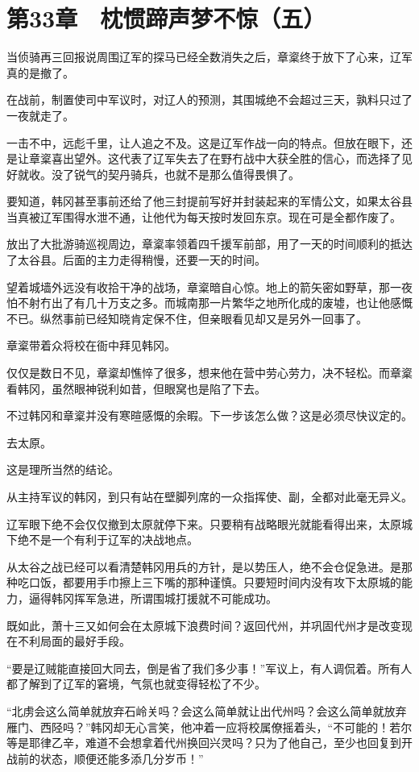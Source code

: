 \section{第33章　枕惯蹄声梦不惊（五）}

当侦骑再三回报说周围辽军的探马已经全数消失之后，章楶终于放下了心来，辽军真的是撤了。

在战前，制置使司中军议时，对辽人的预测，其围城绝不会超过三天，孰料只过了一夜就走了。

一击不中，远彪千里，让人追之不及。这是辽军作战一向的特点。但放在眼下，还是让章楶喜出望外。这代表了辽军失去了在野冇战中大获全胜的信心，而选择了见好就收。没了锐气的契丹骑兵，也就不是那么值得畏惧了。

要知道，韩冈甚至事前还给了他三封提前写好并封装起来的军情公文，如果太谷县当真被辽军围得水泄不通，让他代为每天按时发回东京。现在可是全都作废了。

放出了大批游骑巡视周边，章楶率领着四千援军前部，用了一天的时间顺利的抵达了太谷县。后面的主力走得稍慢，还要一天的时间。

望着城墙外远没有收拾干净的战场，章楶暗自心惊。地上的箭矢密如野草，那一夜怕不射冇出了有几十万支之多。而城南那一片繁华之地所化成的废墟，也让他感慨不已。纵然事前已经知晓肯定保不住，但亲眼看见却又是另外一回事了。

章楶带着众将校在衙中拜见韩冈。

仅仅是数日不见，章楶却憔悴了很多，想来他在营中劳心劳力，决不轻松。而章楶看韩冈，虽然眼神锐利如昔，但眼窝也是陷了下去。

不过韩冈和章楶并没有寒暄感慨的余暇。下一步该怎么做？这是必须尽快议定的。

去太原。

这是理所当然的结论。

从主持军议的韩冈，到只有站在壁脚列席的一众指挥使、副，全都对此毫无异义。

辽军眼下绝不会仅仅撤到太原就停下来。只要稍有战略眼光就能看得出来，太原城下绝不是一个有利于辽军的决战地点。

从太谷之战已经可以看清楚韩冈用兵的方针，是以势压人，绝不会仓促急进。是那种吃口饭，都要用手巾擦上三下嘴的那种谨慎。只要短时间内没有攻下太原城的能力，逼得韩冈挥军急进，所谓围城打援就不可能成功。

既如此，萧十三又如何会在太原城下浪费时间？返回代州，并巩固代州才是改变现在不利局面的最好手段。

“要是辽贼能直接回大同去，倒是省了我们多少事！”军议上，有人调侃着。所有人都了解到了辽军的窘境，气氛也就变得轻松了不少。

“北虏会这么简单就放弃石岭关吗？会这么简单就让出代州吗？会这么简单就放弃雁门、西陉吗？”韩冈却无心言笑，他冲着一应将校属僚摇着头，“不可能的！若尔等是耶律乙辛，难道不会想拿着代州换回兴灵吗？只为了他自己，至少也回复到开战前的状态，顺便还能多添几分岁币！”


